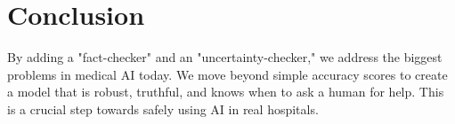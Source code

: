 \documentclass[11pt,a4paper]{article}
\begin{document}
\section{Conclusion}
By adding a "fact-checker" and an "uncertainty-checker," we address the biggest problems in medical AI today. We move beyond simple accuracy scores to create a model that is robust, truthful, and knows when to ask a human for help. This is a crucial step towards safely using AI in real hospitals.


\nocite{*} %

\end{document}
